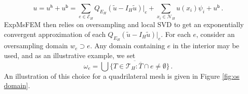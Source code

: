 \documentclass[12pt]{caltech_thesis}
\numberwithin{equation}{section}
\begin{document}
\begin{equation}
    u = u^{\mathsf{h}}+u^{\mathsf{b}} = \sum_{e \in \mathcal{E}_H} Q_{E_H}(\tilde{u}-I_H\tilde{u})|_{e} + \sum_{x_i \in \mathcal{N}_H} u(x_i) \psi_i + u^{\mathsf{b}}\, .
\end{equation}
ExpMsFEM then relies on oversampling and local SVD to get an exponentially convergent approximation of each $Q_{E_H}(\tilde{u}-I_H\tilde{u})|_{e}$. For each $e$, consider an oversampling domain $w_e \supset e$. Any domain containing $e$ in the interior may be used, and as an illustrative example, we set 
\begin{equation*}
    \label{eqn: os domain 1 layer}
        \omega_e=\overline{\bigcup \{T\in \mathcal{T}_H: \overline{T} \cap e \neq \emptyset\}}\, .
    \end{equation*} 
An illustration of this choice for a quadrilateral mesh is given in Figure \ref{fig:os domain}. 
\end{document}
